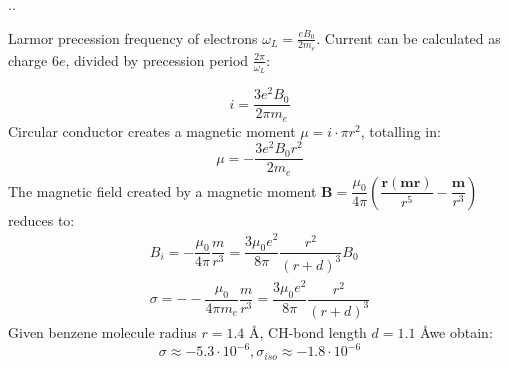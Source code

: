 \documentclass[handout]{beamer}
\begin{document}
\begin{frame}{\thesection.\thesubsection. \insertsubsection}
\begin{minipage}{0.3\textwidth}
			\end{minipage}
			\hspace{0.1cm}
			{\tiny
			\begin{minipage}{0.65\textwidth}
									Larmor precession frequency of electrons $\omega_L = \frac{e B_0}{2 m_e}$. Current can be calculated as charge $6 e$, divided by precession period $\frac{2 \pi}{\omega_L}$:
									\par
									\begin{equation}				    
									i = \dfrac{3e^2 B_0}{2 \pi m_e}
									\end{equation}
				  \onslide<3->
					Circular conductor creates a magnetic moment $\mu = i \cdot \pi r^2 $, totalling in:				
									\begin{equation}
									\mu = -\dfrac{3 e^2 B_0 r^2}{2 m_e}
									\end{equation}
				  \onslide<4->
									The magnetic field created by a magnetic moment  $\bm{B} = \dfrac{\mu_0}{4 \pi}(\dfrac{\bm{r(mr)}}{r^5} - \dfrac{\bm{m}}{r^3}  )$ reduces to:
									\begin{align}
									B_i = -\dfrac{\mu_0}{4 \pi}\dfrac{m}{r^3} = \dfrac{3 \mu_0 e^2}{8 \pi} \dfrac{r^2}{(r+d)^3} B_0 \\
									\sigma = --\dfrac{\mu_0}{4 \pi m_e}\dfrac{m}{r^3} = \dfrac{3 \mu_0 e^2}{8 \pi} \dfrac{r^2}{(r+d)^3}
									\end{align}
				  \onslide<5->
									Given benzene molecule radius $r=1.4$ \AA, CH-bond length $d = 1.1$ \AA we obtain:
									\begin{equation}
									\sigma \approx -5.3 \cdot 10^{-6}, \sigma_{iso} \approx -1.8 \cdot 10^{-6}
									\end{equation}

			\end{minipage}
			
		    }%

		
		

\end{frame}
\end{document}
